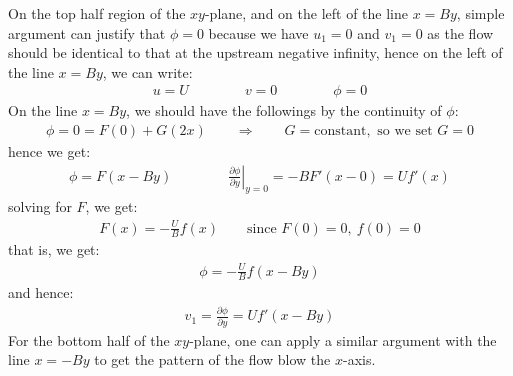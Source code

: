 \documentclass[11pt]{book}
\theoremstyle{break}
\theoremstyle{break}
\begin{document}
On the top half region of the $xy$-plane, and on the left of the line $x = By$, simple argument can justify that $\phi = 0$ because we have $u_1 = 0$ and $v_1 = 0$ as the flow should be identical to that at the upstream negative infinity, hence on the left of the line $x= By$, we can write:
\begin{align*}
u=U \qquad\qquad v=0\qquad\qquad \phi=0
\end{align*}
On the line $x = By$, we should have the followings by the continuity of $\phi$:
\begin{align*}
\phi = 0 = F(0) + G(2x) \qquad \Rightarrow \qquad G = \text{constant}, \text{ so we set }G=0
\end{align*}
hence we get:
\begin{align*}
\phi = F(x-By) \qquad \qquad \left.\frac{\partial \phi}{\partial y}\right|_{y=0} = -BF'(x-0) = Uf'(x)
\end{align*}
solving for $F$, we get:
\begin{align*}
F(x) = -\frac{U}{B}f(x) \qquad\text{since }F(0) = 0, \ f(0) = 0
\end{align*}
that is, we get:
\begin{align*}
\phi = -\frac{U}{B}f(x-By)
\end{align*}
and hence:
\begin{align*}
v_1 = \frac{\partial \phi}{\partial y} = Uf'(x-By)
\end{align*}
For the bottom half of the $xy$-plane, one can apply a similar argument with the line $x = -By$ to get the pattern of the flow blow the $x$-axis. 
\newpage
\end{document}

